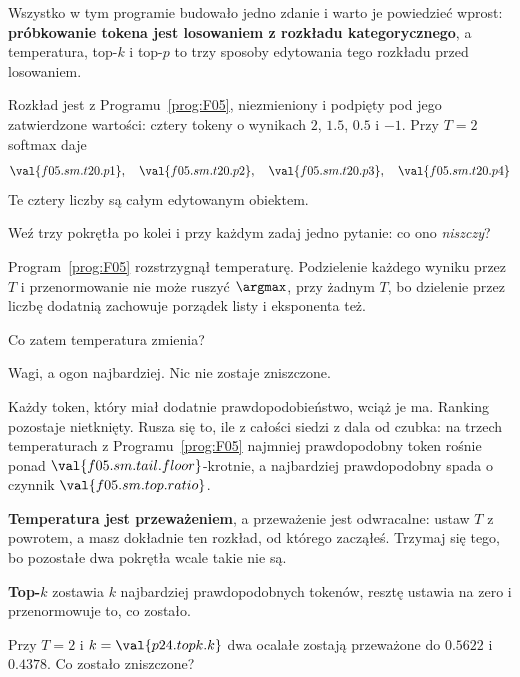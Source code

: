 \begin{fr}
Wszystko w tym programie budowało jedno zdanie i warto je powiedzieć wprost:
\textbf{próbkowanie tokena jest losowaniem z rozkładu kategorycznego}, a
temperatura, top-$k$ i top-$p$ to trzy sposoby edytowania tego rozkładu przed
losowaniem.

Rozkład jest z Programu~\ref{prog:F05}, niezmieniony i podpięty pod jego
zatwierdzone wartości: cztery tokeny o wynikach $2$, $\num{1.5}$, $\num{0.5}$
i $-1$. Przy $T = 2$ softmax daje
\[ \val{f05.sm.t20.p1},\quad \val{f05.sm.t20.p2},\quad
   \val{f05.sm.t20.p3},\quad \val{f05.sm.t20.p4} \]
Te cztery liczby są całym edytowanym obiektem.
\end{fr}

\begin{fr}
Weź trzy pokrętła po kolei i przy każdym zadaj jedno pytanie: co ono
\emph{niszczy}?

Program~\ref{prog:F05} rozstrzygnął temperaturę. Podzielenie każdego wyniku
przez $T$ i przenormowanie nie może ruszyć $\argmax$, przy żadnym $T$, bo
dzielenie przez liczbę dodatnią zachowuje porządek listy i eksponenta też.

Co zatem temperatura zmienia?
\dotline
\nextframe
\end{fr}

\begin{fr}
\begin{ansblock}
Wagi, a ogon najbardziej. Nic nie zostaje zniszczone.
\end{ansblock}

Każdy token, który miał dodatnie prawdopodobieństwo, wciąż je ma. Ranking
pozostaje nietknięty. Rusza się to, ile z całości siedzi z dala od czubka: na
trzech temperaturach z Programu~\ref{prog:F05} najmniej prawdopodobny token
rośnie ponad $\val{f05.sm.tail.floor}$-krotnie, a najbardziej prawdopodobny
spada o czynnik $\val{f05.sm.top.ratio}$.

\textbf{Temperatura jest przeważeniem}, a przeważenie jest odwracalne: ustaw
$T$ z powrotem, a masz dokładnie ten rozkład, od którego zacząłeś. Trzymaj się
tego, bo pozostałe dwa pokrętła wcale takie nie są.
\end{fr}

\begin{fr}
\textbf{Top-$k$} zostawia $k$ najbardziej prawdopodobnych tokenów, resztę
ustawia na zero i przenormowuje to, co zostało.

Przy $T = 2$ i $k = \val{p24.topk.k}$ dwa ocalałe zostają przeważone do
$\num{0.5622}$ i $\num{0.4378}$. Co zostało zniszczone?
\dotline
\nextframe
\end{fr}

